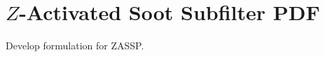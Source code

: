 \section{\texorpdfstring{$Z$}{Z}-Activated Soot Subfilter PDF}
\label{sec:subfilter:zassp}

Develop formulation for ZASSP.
